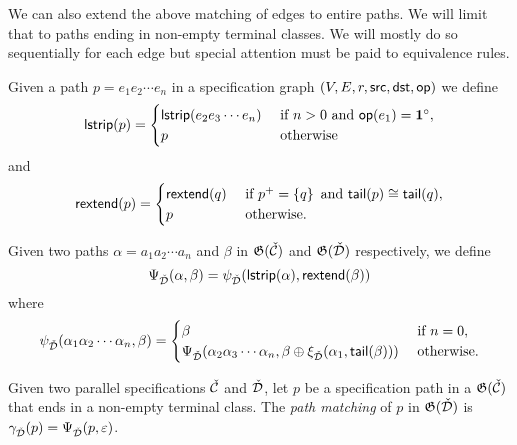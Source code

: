 We can also extend the above matching of edges to entire paths. We will limit that to paths ending in non-empty terminal classes. We will mostly do so sequentially for each edge but special attention must be paid to equivalence rules.

Given a path $p = e_1e_2\dotsm e_n$ in a specification graph $(V,E,r,\textsf{src},\textsf{dst},\textsf{op})$ we define
\[
     \textsf{lstrip}(p) = \begin{cases} \textsf{lstrip}(e_2e_3\dotsm e_n) & \text{ if } n > 0 \text{ and } \textsf{op}(e_1) = \mathbf{1}^\circ,\\
     p & \text{ otherwise}
     \end{cases}
\]
and
\[
    \textsf{rextend}(p) = \begin{cases}
        \textsf{rextend}(q) & \text{ if } p^+ = \left\{q\right\} \text{ and } \textsf{tail}(p) \cong \textsf{tail}(q),\\
        p & \text{ otherwise}.
    \end{cases}
\]

Given two paths $\alpha = a_1a_2 \dotsm a_n$ and $\beta$ in $\mathfrak{G}(\check{\mathcal{C}})$ and $\mathfrak{G}(\check{\mathcal{D}})$ respectively, we define
\[
    \Psi_{\check{\mathcal{D}}}(\alpha,\beta) = \psi_{\check{\mathcal{D}}}(\textsf{lstrip}(\alpha),\textsf{rextend}(\beta)) 
\]
where
\[
    \psi_{\check{\mathcal{D}}}(\alpha_1\alpha_2\dotsm\alpha_n,\beta) = \begin{cases}
        \beta & \text{ if } n = 0,\\
        \Psi_{\check{\mathcal{D}}}(\alpha_2\alpha_3\dotsm\alpha_n, \beta \oplus \xi_{\check{\mathcal{D}}}(\alpha_1,\textsf{tail}(\beta))) & \text{ otherwise}.
    \end{cases}
\]

\begin{definition}\label{def:pathmatch}
Given two parallel specifications $\check{\mathcal{C}}$ and $\check{\mathcal{D}}$, let $p$ be a specification path in a $\mathfrak{G}(\check{\mathcal{C}})$ that ends in a non-empty terminal class. The \emph{path matching} of $p$ in $\mathfrak{G}(\check{\mathcal{D}})$ is $\gamma_{\check{\mathcal{D}}}(p) = \Psi_{\check{\mathcal{D}}}(p,\varepsilon)$.
\end{definition}

